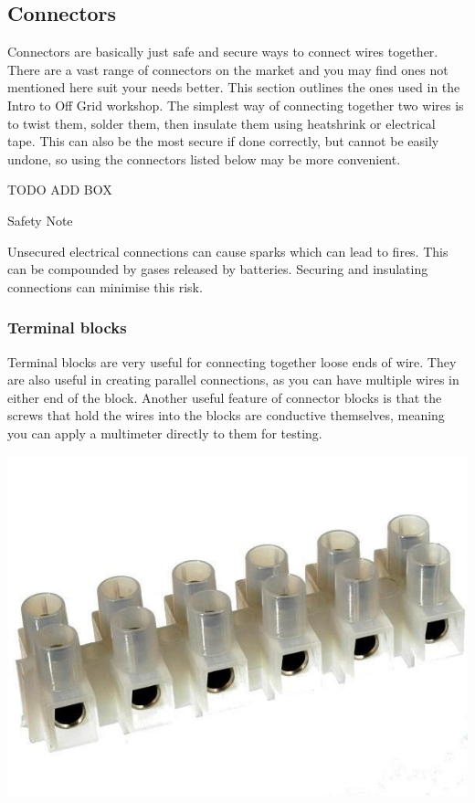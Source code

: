 \documentclass{article}
\theoremstyle{definition}
\theoremstyle{definition}
\theoremstyle{remark}
\begin{document}

  \subsection{Connectors} %
  \label{sub:connectors}

    Connectors are basically just safe and secure ways to connect wires together. There are a vast range of connectors on the market and you may find ones not mentioned here suit your needs better. This section outlines the ones used in the Intro to Off Grid workshop. The simplest way of connecting together two wires is to twist them, solder them, then insulate them using heatshrink or electrical tape. This can also be the most secure if done correctly, but cannot be easily undone, so using the connectors listed below may be more convenient.

    TODO ADD BOX

    Safety Note
     
    Unsecured electrical connections can cause sparks which can lead to fires. This can be compounded by gases released by batteries. Securing and insulating connections can minimise this risk.
  
    \subsubsection{Terminal blocks} %
    \label{ssub:terminal_blocks}

      Terminal blocks are very useful for connecting together loose ends of wire. They are also useful in creating parallel connections, as you can have multiple wires in either end of the block. Another useful feature of connector blocks is that the screws that hold the wires into the blocks are conductive themselves, meaning you can apply a multimeter directly to them for testing.

      \begin{center}
        \includegraphics[width=0.15\paperwidth]{../Images/image_8_3_(terminal_connector).png}
      \end{center}
\end{document}
